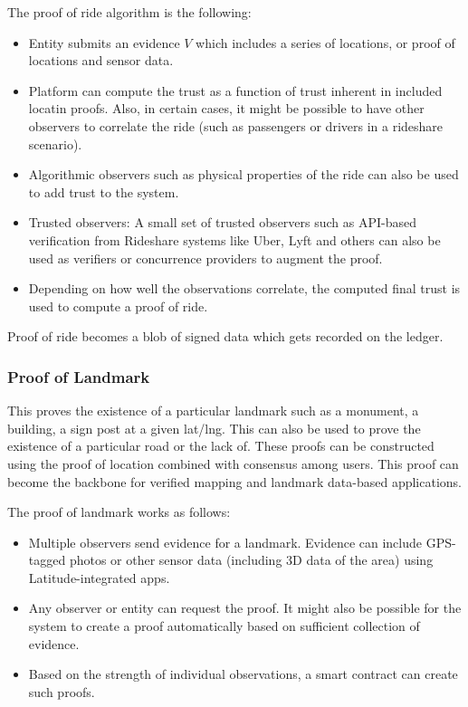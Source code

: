 The proof of ride algorithm is the following:
\begin{itemize}
    \item Entity submits an evidence $V$ which includes a series of locations, or proof of locations and sensor data.
    \item Platform can compute the trust as a function of trust inherent in included locatin proofs. Also, in certain
        cases, it might be possible to have other observers to correlate the ride (such as passengers or drivers in a
        rideshare scenario).
    \item Algorithmic observers such as physical properties of the ride can also be used to add trust to the system.
    \item Trusted observers: A small set of trusted observers such as API-based verification from Rideshare systems like
        Uber, Lyft and others can also be used as verifiers or concurrence providers to augment the proof.
    \item Depending on how well the observations correlate, the computed final trust is used to compute a proof of ride.
\end{itemize}

Proof of ride becomes a blob of signed data which gets recorded on the ledger.

\subsubsection{Proof of Landmark}

This proves the existence of a particular landmark such as a monument, a building, a sign post at a given lat/lng. This
can also be used to prove the existence of a particular road or the lack of. These proofs can be constructed using the
proof of location combined with consensus among users.  This proof can become the backbone for verified mapping and
landmark data-based applications.

The proof of landmark works as follows:

\begin{itemize}
    \item Multiple observers send evidence for a landmark. Evidence can include GPS-tagged photos or other sensor data
        (including 3D data of the area) using Latitude-integrated apps.
    \item Any observer or entity can request the proof. It might also
        be possible for the system to create a proof automatically based on sufficient collection of evidence.
    \item Based on the strength of individual observations, a smart contract can create such proofs.
\end{itemize}

